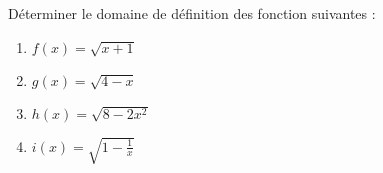
Déterminer le domaine de définition des fonction suivantes :
\begin{enumerate}
\item $f(x)=\sqrt{x + 1} $
\item $g(x)=\sqrt{4 - x} $
\item $h(x)=\sqrt{8-2x^2} $
\item $i(x)=\sqrt{1- \frac{1}{x}} $
\end{enumerate}